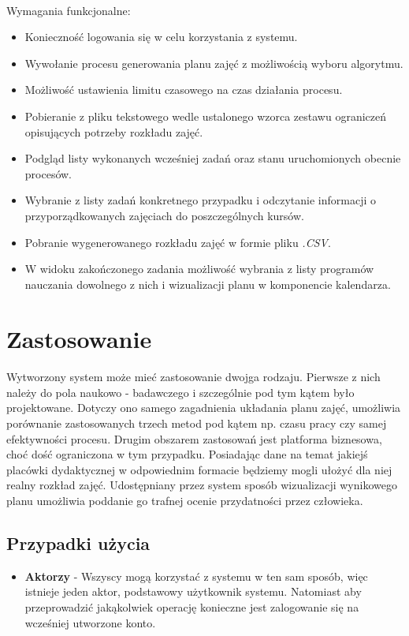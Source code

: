 \paragraph{}Wymagania funkcjonalne:
\begin{itemize}
\item Konieczność logowania się w celu korzystania z systemu.
\item Wywołanie procesu generowania planu zajęć z możliwością wyboru algorytmu.
\item Możliwość ustawienia limitu czasowego na czas działania procesu.
\item Pobieranie z pliku tekstowego wedle ustalonego wzorca zestawu ograniczeń opisujących potrzeby rozkładu zajęć.
\item Podgląd listy wykonanych wcześniej zadań oraz stanu uruchomionych obecnie procesów.
\item Wybranie z listy zadań konkretnego przypadku i odczytanie informacji o przyporządkowanych zajęciach do poszczególnych kursów.
\item Pobranie wygenerowanego rozkładu zajęć w formie pliku \emph{.CSV}.
\item W widoku zakończonego zadania możliwość wybrania z listy programów nauczania dowolnego z nich i wizualizacji planu w komponencie kalendarza.
\end{itemize}
\section{Zastosowanie}
\paragraph{}Wytworzony system może mieć zastosowanie dwojga rodzaju. Pierwsze z nich należy do pola naukowo - badawczego i szczególnie pod tym kątem było projektowane. Dotyczy ono samego zagadnienia układania planu zajęć, umożliwia porównanie zastosowanych trzech metod pod kątem np. czasu pracy czy samej efektywności procesu. Drugim obszarem zastosowań jest platforma biznesowa, choć dość ograniczona w tym przypadku. Posiadając dane na temat jakiejś placówki dydaktycznej w odpowiednim formacie będziemy mogli ułożyć dla niej realny rozkład zajęć. Udostępniany przez system sposób wizualizacji wynikowego planu umożliwia poddanie go trafnej ocenie przydatności przez człowieka.
\subsection{Przypadki użycia}
\begin{itemize}
\item{\textbf{Aktorzy}} - Wszyscy mogą korzystać z systemu w ten sam sposób, więc istnieje jeden aktor, podstawowy użytkownik systemu. Natomiast aby przeprowadzić jakąkolwiek operację konieczne jest zalogowanie się na wcześniej utworzone konto.
\end{itemize}
